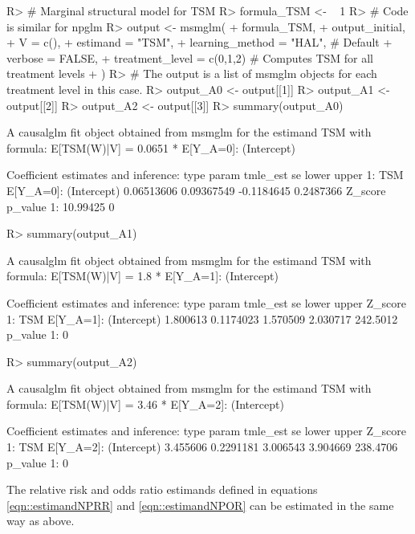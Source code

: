 \documentclass[
]{jss}
\begin{document}
\begin{CodeChunk}
\begin{CodeInput}
R> # Marginal structural model for TSM
R> formula_TSM <- ~ 1  
R> # Code is similar for npglm
R> output <- msmglm( 
+       formula_TSM, 
+       output_initial,
+       V = c(),
+       estimand = "TSM", 
+       learning_method = "HAL", # Default
+       verbose = FALSE,
+       treatment_level = c(0,1,2) # Computes TSM for all treatment levels
+       )
R> # The output is a list of msmglm objects for each treatment level in this case.
R> output_A0 <- output[[1]]
R> output_A1 <- output[[2]]
R> output_A2 <- output[[3]]
R> summary(output_A0)
\end{CodeInput}
\begin{CodeOutput}
A causalglm fit object obtained from msmglm for the estimand TSM with formula: 
E[TSM(W)|V] = 0.0651 * E[Y_{A=0}]: (Intercept)

Coefficient estimates and inference:
   type                   param   tmle_est         se      lower     upper
1:  TSM E[Y_{A=0}]: (Intercept) 0.06513606 0.09367549 -0.1184645 0.2487366
    Z_score p_value
1: 10.99425       0
\end{CodeOutput}
\begin{CodeInput}
R> summary(output_A1)
\end{CodeInput}
\begin{CodeOutput}
A causalglm fit object obtained from msmglm for the estimand TSM with formula: 
E[TSM(W)|V] = 1.8 * E[Y_{A=1}]: (Intercept)

Coefficient estimates and inference:
   type                   param tmle_est        se    lower    upper  Z_score
1:  TSM E[Y_{A=1}]: (Intercept) 1.800613 0.1174023 1.570509 2.030717 242.5012
   p_value
1:       0
\end{CodeOutput}
\begin{CodeInput}
R> summary(output_A2)
\end{CodeInput}
\begin{CodeOutput}
A causalglm fit object obtained from msmglm for the estimand TSM with formula: 
E[TSM(W)|V] = 3.46 * E[Y_{A=2}]: (Intercept)

Coefficient estimates and inference:
   type                   param tmle_est        se    lower    upper  Z_score
1:  TSM E[Y_{A=2}]: (Intercept) 3.455606 0.2291181 3.006543 3.904669 238.4706
   p_value
1:       0
\end{CodeOutput}
\end{CodeChunk}

The relative risk and odds ratio estimands defined in equations
\ref{eqn::estimandNPRR} and \ref{eqn::estimandNPOR} can be estimated in
the same way as above.
\end{document}
